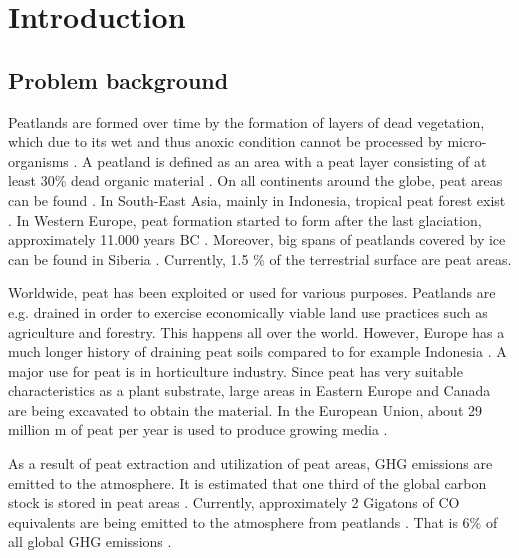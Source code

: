 \chapter{Introduction}

\section{Problem background}

Peatlands are formed over time by the formation of layers of dead vegetation, which due to its wet and thus anoxic condition cannot be processed by micro-organisms \citep{clymo1984limits}. A peatland is defined as an area with a peat layer consisting of at least 30\% dead organic material \citep{joosten2002wise}. On all continents around the globe, peat areas can be found \citep{joosten2002wise}. In South-East Asia, mainly in Indonesia, tropical peat forest exist \citep{page2011global}. In Western Europe, peat formation started to form after the last glaciation, approximately 11.000 years BC \citep{brouns2016effects}. Moreover, big spans of peatlands covered by ice can be found in Siberia \citep{frey2005amplified}. Currently, 1.5 \% of the terrestrial surface are peat areas.

Worldwide, peat has been exploited or used for various purposes. Peatlands are e.g. drained in order to exercise economically viable land use practices such as agriculture and forestry. This happens all over the world. However, Europe has a much longer history of draining peat soils compared to for example Indonesia \citep{joosten2002wise}. A major use for peat is in horticulture industry. Since peat has very suitable characteristics as a plant substrate, large areas in Eastern Europe and Canada are being excavated to obtain the material. In the European Union, about 29 million m of peat per year is used to produce growing media \citep{blievernicht2012youngest}.

As a result of peat extraction and utilization of peat areas, \ac{GHG} emissions are emitted to the atmosphere. It is estimated that one third of the global carbon stock is stored in peat areas \citep{page2011global}. Currently, approximately 2 Gigatons of CO equivalents are being emitted to the atmosphere from peatlands \citep{joosten2009global}. That is 6\% of all global \ac{GHG} emissions \citep{joosten2012peatlands}.

